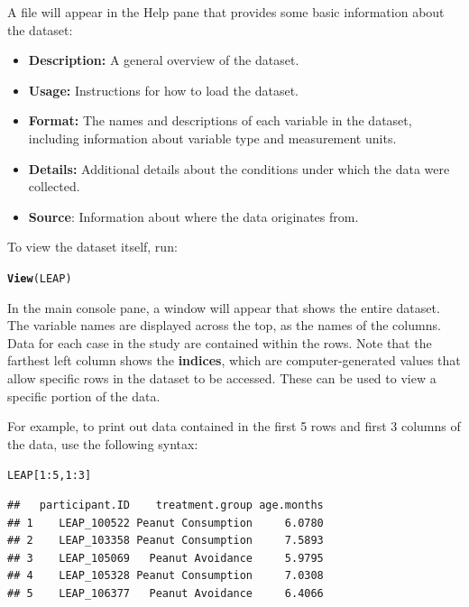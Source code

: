 \documentclass{report}\usepackage[]{graphicx}\usepackage[]{color}
\makeatletter
\newcommand{\hlnum}[1]{\textcolor[rgb]{0.686,0.059,0.569}{#1}}%
\newcommand{\hlopt}[1]{\textcolor[rgb]{0,0,0}{#1}}%
\newcommand{\hlstd}[1]{\textcolor[rgb]{0.345,0.345,0.345}{#1}}%
\newcommand{\hlkwd}[1]{\textcolor[rgb]{0.737,0.353,0.396}{\textbf{#1}}}%
\newenvironment{kframe}{%
 \def\at@end@of@kframe{}%
 \ifinner\ifhmode%
  \def\at@end@of@kframe{\end{minipage}}%
  \begin{minipage}{\columnwidth}%
 \fi\fi%
 \def\FrameCommand##1{\hskip\@totalleftmargin \hskip-\fboxsep
 \colorbox{shadecolor}{##1}\hskip-\fboxsep
     \hskip-\linewidth \hskip-\@totalleftmargin \hskip\columnwidth}%
 \MakeFramed {\advance\hsize-\width
   \@totalleftmargin\z@ \linewidth\hsize
   \@setminipage}}%
 {\par\unskip\endMakeFramed%
 \at@end@of@kframe}
\newenvironment{knitrout}{}{} %
\makeatother
\begin{document}
A file will appear in the Help pane that provides some basic information about the dataset:

\begin{itemize}
\item \textbf{Description:} A general overview of the dataset. 
\item \textbf{Usage:} Instructions for how to load the dataset. 
\item \textbf{Format:} The names and descriptions of each variable in the dataset, including information about variable type and measurement units.
\item \textbf{Details:} Additional details about the conditions under which the data were collected.
\item \textbf{Source}: Information about where the data originates from.
\end{itemize}

To view the dataset itself, run:

\begin{knitrout}
\color{fgcolor}\begin{kframe}
\begin{alltt}
\hlkwd{View}\hlstd{(LEAP)}
\end{alltt}
\end{kframe}
\end{knitrout}

In the main console pane, a window will appear that shows the entire dataset. The variable names are displayed across the top, as the names of the columns. Data for each case in the study are contained within the rows. Note that the farthest left column shows the \textbf{indices}, which are computer-generated values that allow specific rows in the dataset to be accessed. These can be used to view a specific portion of the data.

For example, to print out data contained in the first 5 rows and first 3 columns of the data, use the following syntax:

\begin{knitrout}
\color{fgcolor}\begin{kframe}
\begin{alltt}
\hlstd{LEAP[}\hlnum{1}\hlopt{:}\hlnum{5}\hlstd{,}\hlnum{1}\hlopt{:}\hlnum{3}\hlstd{]}
\end{alltt}
\begin{verbatim}
##   participant.ID    treatment.group age.months
## 1    LEAP_100522 Peanut Consumption     6.0780
## 2    LEAP_103358 Peanut Consumption     7.5893
## 3    LEAP_105069   Peanut Avoidance     5.9795
## 4    LEAP_105328 Peanut Consumption     7.0308
## 5    LEAP_106377   Peanut Avoidance     6.4066
\end{verbatim}
\end{kframe}
\end{knitrout}
\end{document}
